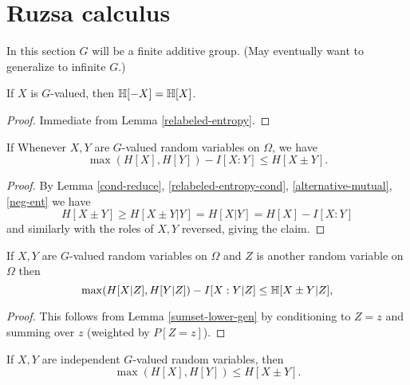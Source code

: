 \chapter{Ruzsa calculus}

In this section $G$ will be a finite additive group.  (May eventually want to generalize to infinite $G$.)

\begin{lemma}\label{neg-ent}  If $X$ is $G$-valued, then $\mathbb{H}[-X]=\mathbb{H}[X]$.
\end{lemma}

\begin{proof} Immediate from Lemma \ref{relabeled-entropy}.
\end{proof}

\begin{lemma}\label{sumset-lower-gen} If
Whenever $X,Y$ are $G$-valued random variables on $\Omega$, we have
$$ \max(H[X], H[Y]) - I[X:Y] \leq H[X \pm Y].$$
\end{lemma}

\begin{proof}   By Lemma \ref{cond-reduce}, \ref{relabeled-entropy-cond}, \ref{alternative-mutual}, \ref{neg-ent} we have
$$
 H[X\pm Y] \geq H[X\pm Y|Y] = H[X|Y]= H[X] - I[X:Y]
$$
and similarly with the roles of $X,Y$ reversed, giving the claim.
\end{proof}

\begin{corollary}\label{sumset-lower-gen-cond} If $X,Y$ are $G$-valued random variables on $\Omega$ and $Z$ is another random variable on $\Omega$ then
\[
  \max(H[X|Z], H[Y|Z]) - I[X:Y|Z] \leq \mathbb{H}[X\pm Y|Z],
\]
\end{corollary}

\begin{proof}  This follows from Lemma \ref{sumset-lower-gen} by conditioning to $Z = z$ and summing over $z$ (weighted by $P[Z=z]$).
\end{proof}

\begin{corollary}\label{sumset-lower} If $X,Y$ are independent $G$-valued random variables, then
$$\max(H[X], H[Y]) \leq H[X\pm Y].
$$
\end{corollary}

